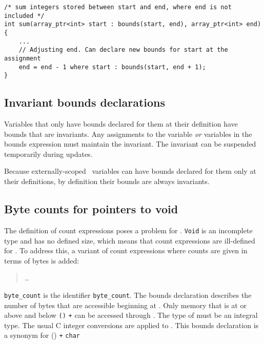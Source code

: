 \begin{verbatim}
/* sum integers stored between start and end, where end is not included */
int sum(array_ptr<int> start : bounds(start, end), array_ptr<int> end)
{ 
    ...
    // Adjusting end. Can declare new bounds for start at the assignment
    end = end - 1 where start : bounds(start, end + 1);
}
\end{verbatim}


\subsection{Invariant bounds declarations}
\label{section:invariant-bounds-declarations}

Variables that only have bounds declared for them at their definition
have bounds that are invariants. Any assignments to the variable
\emph{or} variables in the bounds expression must maintain the
invariant. The invariant can be suspended temporarily during updates.

Because externally-scoped \arrayptr\ variables can have bounds declared
for them only at their definitions, by definition their bounds are
always invariants.

\subsection{Byte counts for pointers to void}
\label{section:pointers-to-void}

The definition of count expressions poses a problem for
\arrayptrvoid. \texttt{Void} is an
incomplete type and has no defined size, which means that count
expressions are ill-defined for
\arrayptrvoid. To address this, a
variant of count expressions where counts are given in terms of bytes is
added:


\begin{quote}
\ldots{}

\end{quote}

\texttt{byte\_count} is the identifier \texttt{byte\_count}.
The bounds declaration 
describes the number of bytes that are accessible beginning at . 
Only memory that is at or above  and below \texttt{(\arrayptrchar)}
 \texttt{+}  can be accessed through . The type
of  must be an integral type.  The usual C integer conversions are
applied to .  This bounds declaration is a synonym for 
           {
                      {(\arrayptrchar)  \texttt{+} }
                      {\texttt{char}}}


